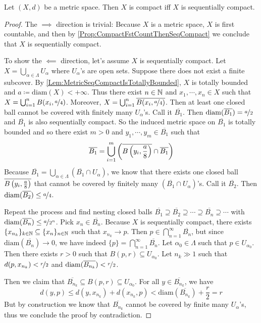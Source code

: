 \documentclass[screen]{techreport}
\numberwithin{equation}{section}
\begin{document}
\begin{proposition}\label{Prop:MetricCompactIffSeqCompact}
	Let $(X,d)$ be a metric space.
	Then $X$ is compact iff $X$ is sequentially compact.
\end{proposition}
\begin{proof}
	The ${\implies}$ direction is trivial: Because $X$ is a metric space, $X$ is first countable, and then by \cref{Prop:CompactFstCountThenSeqCompact} we conclude that $X$ is sequentially compact.
	
	To show the ${\impliedby}$ direction, let's assume $X$ is sequentially compact.
	Let $X = \bigcup_{\alpha \in \Lambda} U_\alpha$ where $U_\alpha$'s are open sets.
	Suppose there does not exist a finite subcover.
	By \cref{Lem:MetricSeqCompactIsTotallyBounded}, $X$ is totally bounded and $a	\coloneqq \mathrm{diam}(X) < +\infty$.
	Thus there exist $n \in \mathbb{N}$ and $x_1,\cdots,x_n \in X$ such that $X = \bigcup_{i=1}^n B(x_i, \nicefrac{a}{4})$.
	Moreover, $X = \bigcup_{i=1}^n \overline{B(x_i, \nicefrac{a}{4})}$.
	Then at least one closed ball cannot be covered with finitely many $U_\alpha$'s.
	Call it $\overline{B_1}$. Then $\mathrm{diam}(\overline{B_1}) = \nicefrac{a}{2}$ and $\overline{B_1}$ is also sequentially compact.
	So the induced metric space on $\overline{B_1}$ is totally bounded and so there exist $m > 0$ and $y_1,\cdots,y_m \in \overline{B_1}$ such that
	\[
	\overline{B_1} = \bigcup_{i=1}^m\left({ \overline{B\left({y_i,\frac{a}{8}}\right)} \cap \overline{B_1} }\right)
	\]
	Because $\overline{B_1}=\bigcup_{\alpha \in \Lambda} (\overline{B_1} \cap U_\alpha)$, we know that there exists one closed ball $\overline{B\left({y_i,\frac{a}{8}}\right)}$ that cannot be covered by finitely many $(\overline{B_1} \cap U_\alpha)$'s.
	Call it $\overline{B_2}$. Then $\mathrm{diam}(\overline{B_2}) \le \nicefrac{a}{4}$.
	
	Repeat the process and find nesting closed balls $\overline{B_1} \supseteq \overline{B_2} \supseteq \cdots \supseteq \overline{B_n} \supseteq \cdots$ with $\mathrm{diam}(\overline{B_n}) \le \nicefrac{a}{2^n}$.
	Pick $x_n \in \overline{B_n}$.
	Because $X$ is sequentially compact, there exists $\{x_{n_k}\}_{k \in \mathbb{N}} \subseteq \{x_n\}_{n \in \mathbb{N}}$ such that $x_{n_k} \rightarrow p$.
	Then $p \in \bigcap_{n=1}^\infty \overline{B_n}$, but since $\mathrm{diam}(\overline{B_n}) \rightarrow 0$, we have indeed $\{p\} = \bigcap_{n=1}^\infty \overline{B_n}$.
	Let $\alpha_0 \in \Lambda$ such that $p \in U_{\alpha_0}$.
	Then there exists $r > 0$ such that $B(p,r) \subseteq U_{\alpha_0}$.
	Let $n_k \gg 1$ such that $d(p,x_{n_k}) < \nicefrac{r}{2}$ and $\mathrm{diam}(\overline{B_{n_k}}) < \nicefrac{r}{2}$.
	
	Then we claim that $\overline{B_{n_k}} \subseteq B(p,r) \subseteq U_{\alpha_0}$.
	For all $y \in \overline{B_{n_k}}$, we have
	\[
	d(y,p) \le d(y,x_{n_k}) + d(x_{n_k}, p) < \mathrm{diam}(\overline{B_{n_k}}) + \frac{r}{2} = r
	\]
	But by construction we know that $\overline{B_{n_k}}$ cannot be covered by finite many $U_\alpha$'s, thus we conclude the proof by contradiction.
\end{proof}
\end{document}
